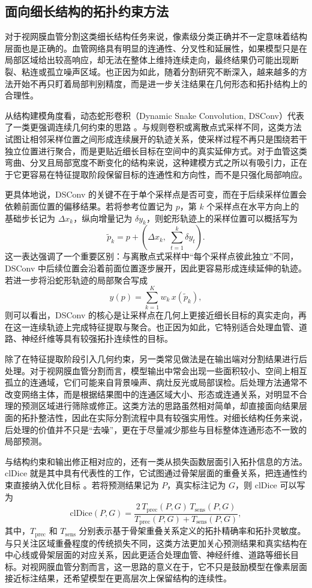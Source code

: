 \documentclass[a4paper,12pt]{article}
\begin{document}
\subsection{面向细长结构的拓扑约束方法}
对于视网膜血管分割这类细长结构任务来说，像素级分类正确并不一定意味着结构层面也是正确的。血管网络具有明显的连通性、分叉性和延展性，如果模型只是在局部区域给出较高响应，却无法在整体上维持连续走向，最终结果仍可能出现断裂、粘连或孤立噪声区域。也正因为如此，随着分割研究不断深入，越来越多的方法开始不再只盯着局部判别精度，而是进一步关注结果在几何形态和拓扑结构上的合理性。

从结构建模角度看，动态蛇形卷积（Dynamic Snake Convolution, DSConv）代表了一类更强调连续几何约束的思路 \cite{qi2023dsc}。与规则卷积或离散点式采样不同，这类方法试图让相邻采样位置之间形成连续展开的轨迹关系，使采样过程不再只是围绕若干独立位置进行聚合，而是更贴近细长目标在空间中的真实延伸方式。对于血管这类弯曲、分叉且局部宽度不断变化的结构来说，这种建模方式之所以有吸引力，正在于它更容易在特征提取阶段保留目标的连通性和方向性，而不是只强化局部响应。

更具体地说，DSConv 的关键不在于单个采样点是否可变，而在于后续采样位置会依赖前面位置的偏移结果。若将参考位置记为 \(p\)，第 \(k\) 个采样点在水平方向上的基础步长记为 \(\Delta x_k\)，纵向增量记为 \(\delta y_k\)，则蛇形轨迹上的采样位置可以概括写为
\[
\tilde{p}_k = p + \left(\Delta x_k,\; \sum_{t=1}^{k}\delta y_t\right).
\]
这一表达强调了一个重要区别：与离散点式采样中“每个采样点彼此独立”不同，DSConv 中后续位置会沿着前面位置逐步展开，因此更容易形成连续延伸的轨迹。若进一步将沿蛇形轨迹的局部聚合写成
\[
y(p)=\sum_{k=1}^{K} w_k\,x(\tilde{p}_k),
\]
则可以看出，DSConv 的核心是让采样点在几何上更接近细长目标的真实走向，再在这一连续轨迹上完成特征提取与聚合。也正因为如此，它特别适合处理血管、道路、神经纤维等具有较强拓扑连续性的目标。

除了在特征提取阶段引入几何约束，另一类常见做法是在输出端对分割结果进行后处理。对于视网膜血管分割而言，模型输出中常会出现一些面积较小、空间上相互孤立的连通域，它们可能来自背景噪声、病灶反光或局部误检。后处理方法通常不改变网络主体，而是根据结果图中的连通区域大小、形态或连通关系，对明显不合理的预测区域进行筛除或修正。这类方法的思路虽然相对简单，却直接面向结果层面的拓扑整洁性，因此在实际分割流程中具有较强实用性。对细长结构任务来说，后处理的价值并不只是“去噪”，更在于尽量减少那些与目标整体连通形态不一致的局部预测。

与结构约束和输出修正相对应的，还有一类从损失函数层面引入拓扑信息的方法。clDice 就是其中具有代表性的工作，它试图通过骨架层面的重叠关系，把连通性约束直接纳入优化目标 \cite{shit2021cldice}。若将预测结果记为 \(P\)，真实标注记为 \(G\)，则 clDice 可以写为
\[
\mathrm{clDice}(P,G)=
\frac{2\,T_{\mathrm{prec}}(P,G)\,T_{\mathrm{sens}}(P,G)}
{T_{\mathrm{prec}}(P,G)+T_{\mathrm{sens}}(P,G)},
\]
其中，\(T_{\mathrm{prec}}\) 和 \(T_{\mathrm{sens}}\) 分别表示基于骨架重叠关系定义的拓扑精确率和拓扑灵敏度。与只关注区域重叠程度的传统损失不同，这类方法更加关心预测结果和真实结构在中心线或骨架层面的对应关系，因此更适合处理血管、神经纤维、道路等细长目标。对视网膜血管分割而言，这一思路的意义在于，它不只是鼓励模型在像素层面接近标注结果，还希望模型在更高层次上保留结构的连续性。
\end{document}
